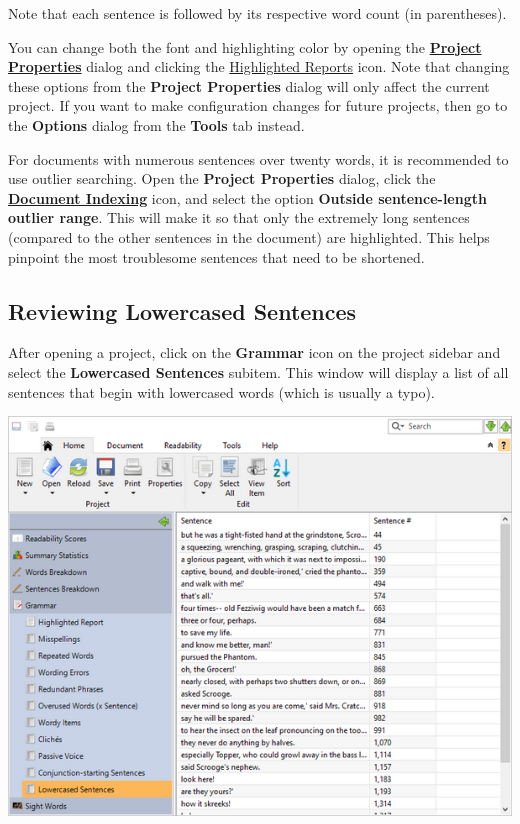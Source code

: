 \documentclass[
]{book}
\theoremstyle{definition}
\theoremstyle{definition}
\theoremstyle{definition}
\theoremstyle{definition}
\theoremstyle{remark}
\begin{document}
Note that each sentence is followed by its respective word count (in parentheses).

You can change both the font and highlighting color by opening the \protect\hyperlink{options-overview}{\textbf{Project Properties}} dialog and clicking the \protect\hyperlink{options-highlighted-reports}{Highlighted Reports} icon. Note that changing these options from the \textbf{Project Properties} dialog will only affect the current project. If you want to make configuration changes for future projects, then go to the \textbf{Options} dialog from the \textbf{Tools} tab instead.

For documents with numerous sentences over twenty words, it is recommended to use outlier searching. Open the \textbf{Project Properties} dialog, click the \protect\hyperlink{document-analysis}{\textbf{Document Indexing}} icon, and select the option \textbf{Outside sentence-length outlier range}. This will make it so that only the extremely long sentences (compared to the other sentences in the document) are highlighted. This helps pinpoint the most troublesome sentences that need to be shortened.

\hypertarget{reviewing-lowercased-sentences}{%
\subsection*{Reviewing Lowercased Sentences}\label{reviewing-lowercased-sentences}}

After opening a project, click on the \textbf{Grammar} icon on the project sidebar and select the \textbf{Lowercased Sentences} subitem. This window will display a list of all sentences that begin with lowercased words (which is usually a typo).

\includegraphics{Images/lowercasedsent.png}
\end{document}
